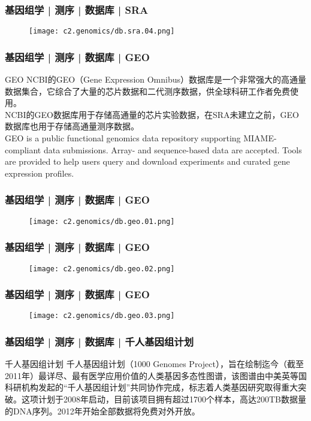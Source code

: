 \begin{frame}
  \frametitle{基因组学 | 测序 | 数据库 | SRA}
  \begin{figure}
    \centering
    \texttt{[image: c2.genomics/db.sra.04.png]}
  \end{figure}
\end{frame}
    
\begin{frame}
  \frametitle{基因组学 | 测序 | 数据库 | GEO}
  \begin{block}{GEO}
NCBI的GEO（Gene Expression Omnibus）数据库是一个非常强大的高通量数据集合，它综合了大量的芯片数据和二代测序数据，供全球科研工作者免费使用。\\
\vspace{1em}
NCBI的GEO数据库用于存储高通量的芯片实验数据，在SRA未建立之前，GEO数据库也用于存储高通量测序数据。\\
\vspace{1em}
GEO is a public functional genomics data repository supporting MIAME-compliant data submissions. Array- and sequence-based data are accepted. Tools are provided to help users query and download experiments and curated gene expression profiles.
  \end{block}
\end{frame}
    
\begin{frame}
  \frametitle{基因组学 | 测序 | 数据库 | GEO}
  \begin{figure}
    \centering
    \texttt{[image: c2.genomics/db.geo.01.png]}
  \end{figure}
\end{frame}
    
\begin{frame}
  \frametitle{基因组学 | 测序 | 数据库 | GEO}
  \begin{figure}
    \centering
    \texttt{[image: c2.genomics/db.geo.02.png]}
  \end{figure}
\end{frame}

\begin{frame}
  \frametitle{基因组学 | 测序 | 数据库 | GEO}
  \begin{figure}
    \centering
    \texttt{[image: c2.genomics/db.geo.03.png]}
  \end{figure}
\end{frame}
    
\begin{frame}
  \frametitle{基因组学 | 测序 | 数据库 | 千人基因组计划}
  \begin{block}{千人基因组计划}
千人基因组计划（1000 Genomes Project），旨在绘制迄今（截至2011年）最详尽、最有医学应用价值的人类基因多态性图谱，该图谱由中美英等国科研机构发起的“千人基因组计划”共同协作完成，标志着人类基因研究取得重大突破。这项计划于2008年启动，目前该项目拥有超过1700个样本，高达200TB数据量的DNA序列。2012年开始全部数据将免费对外开放。
  \end{block}
\end{frame}
    
